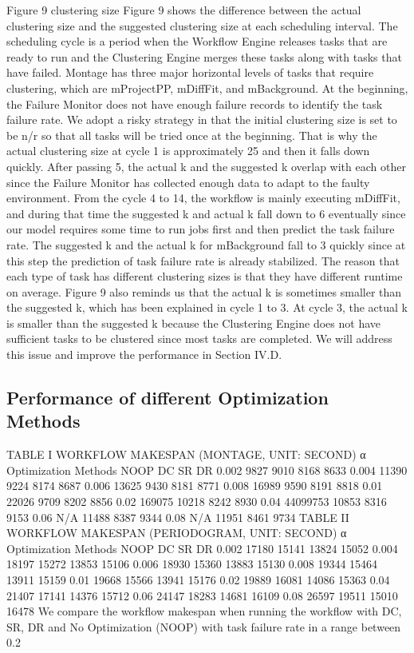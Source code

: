 \documentclass{IOS-Book-Article}
\begin{document}
Figure 9	clustering size
Figure 9 shows the difference between the actual clustering size and the suggested clustering size at each scheduling interval. The scheduling cycle is a period when the Workflow Engine releases tasks that are ready to run and the Clustering Engine merges these tasks along with tasks that have failed. Montage has three major horizontal levels of tasks that require clustering, which are mProjectPP, mDiffFit, and mBackground. At the beginning, the Failure Monitor does not have enough failure records to identify the task failure rate. We adopt a risky strategy in that the initial clustering size is set to be n/r so that all tasks will be tried once at the beginning. That is why the actual clustering size at cycle 1 is approximately 25 and then it falls down quickly. After passing 5, the actual k and the suggested k overlap with each other since the Failure Monitor has collected enough data to adapt to the faulty environment. From the cycle 4 to 14, the workflow is mainly executing mDiffFit, and during that time the suggested k and actual k fall down to 6 eventually since our model requires some time to run jobs first and then predict the task failure rate. The suggested k and the actual k for mBackground fall to 3 quickly since at this step the prediction of task failure rate is already stabilized. The reason that each type of task has different clustering sizes is that they have different runtime on average. 
  Figure 9 also reminds us that the actual k is sometimes smaller than the suggested k, which has been explained in cycle 1 to 3. At cycle 3, the actual k is smaller than the suggested k because the Clustering Engine does not have sufficient tasks to be clustered since most tasks are completed. We will address this issue and improve the performance in Section IV.D. 

\subsection{Performance of different Optimization Methods}
TABLE I	WORKFLOW MAKESPAN (MONTAGE, UNIT: SECOND) 
α	Optimization Methods
	NOOP	DC	SR	DR
0.002	9827	9010	8168	8633
0.004	11390	9224	8174	8687
0.006	13625	9430	8181	8771
0.008	16989	9590	8191	8818
0.01	22026	9709	8202	8856
0.02	169075	10218	8242	8930
0.04	44099753	10853	8316	9153
0.06	N/A 	11488	8387	9344
0.08	N/A	11951	8461	9734
TABLE II	WORKFLOW MAKESPAN (PERIODOGRAM, UNIT: SECOND) 
α	Optimization Methods
	NOOP	DC	SR	DR
0.002	17180	15141	13824	15052
0.004	18197	15272	13853	15106
0.006	18930	15360	13883	15130
0.008	19344	15464	13911	15159
0.01	19668	15566	13941	15176
0.02	19889	16081	14086	15363
0.04	21407	17141	14376	15712
0.06	24147	18283	14681	16109
0.08	26597	19511	15010	16478
We compare the workflow makespan when running the workflow with DC, SR, DR and No Optimization (NOOP) with task failure rate in a range between 0.2%
\end{document}
